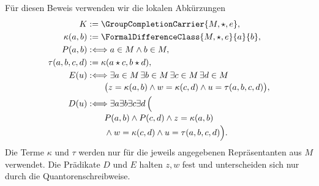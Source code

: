 \par{}
\hypertarget{differences.statement.GroupCompletionOperationQuotientDescent}{}
Für diesen Beweis verwenden wir die lokalen Abkürzungen
\[
  \begin{aligned}
    K&:=\GroupCompletionCarrier{M,\star,e},\\
    \kappa(a,b)&:=\FormalDifferenceClass{M,\star,e}{a}{b},\\
    P(a,b)&:\Longleftrightarrow a\in M\land b\in M,\\
    \tau(a,b,c,d)&:=\kappa(a\star c,b\star d),\\
    E(u)&:\Longleftrightarrow
      \exists a\in M\,\exists b\in M\,\exists c\in M\,\exists d\in M\,\\[-2pt]
      &\qquad\bigl(z=\kappa(a,b)\land w=\kappa(c,d)
        \land u=\tau(a,b,c,d)\bigr),\\
    D(u)&:\Longleftrightarrow
      \exists a\exists b\exists c\exists d\,\Bigl(\\[-2pt]
      &\qquad P(a,b)\land P(c,d)\land z=\kappa(a,b)\\[-2pt]
      &\qquad\land w=\kappa(c,d)\land u=\tau(a,b,c,d)\Bigr).
  \end{aligned}
\]
Die Terme \(\kappa\) und \(\tau\) werden nur für die jeweils angegebenen
Repräsentanten aus \(M\) verwendet. Die Prädikate \(D\) und \(E\) halten
\(z,w\) fest und unterscheiden sich nur durch die Quantorenschreibweise.
